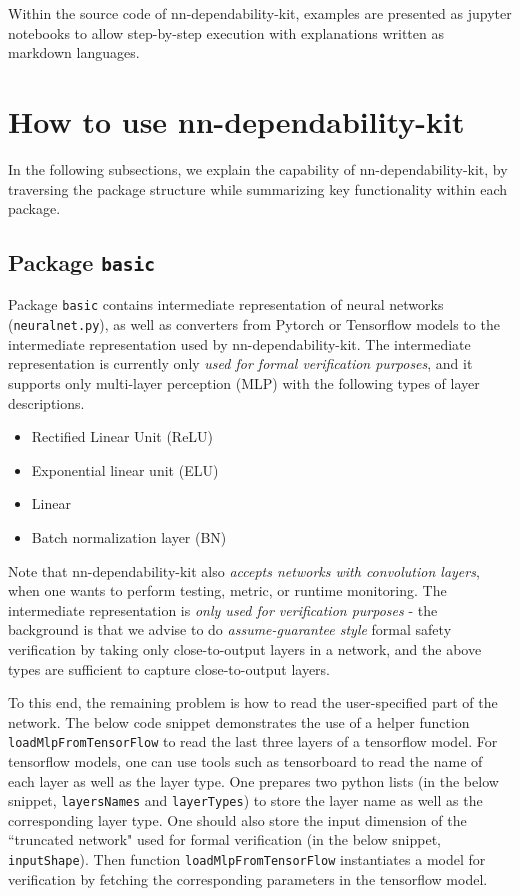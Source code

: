 \documentclass{article}
\begin{document}
Within the source code of \textsf{nn-dependability-kit}, examples are presented as jupyter notebooks to allow step-by-step execution with explanations written as markdown languages.  

\section{How to use \textsf{nn-dependability-kit}}

In the following subsections, we explain the capability of \textsf{nn-dependability-kit}, by traversing the package structure while summarizing key functionality within each package. 

\subsection{Package \texttt{basic}} 

Package \texttt{basic} contains intermediate representation of neural networks (\texttt{neuralnet.py}), as well as converters from Pytorch or Tensorflow models to the intermediate representation used by \textsf{nn-dependability-kit}. The intermediate representation is currently only \emph{used for formal verification purposes}, and it supports only multi-layer perception (MLP) with the following types of layer descriptions. 

\begin{itemize}
    \item Rectified Linear Unit (ReLU)
    \item Exponential linear unit (ELU)
    \item Linear 
    \item Batch normalization layer (BN)
\end{itemize}

Note that \textsf{nn-dependability-kit} also \emph{accepts networks with convolution layers}, when one wants to perform testing, metric, or runtime monitoring. The intermediate representation is \emph{only used for verification purposes} - the background is that we advise to do \emph{assume-guarantee style} formal safety verification by taking only close-to-output layers in a network, and the above types are sufficient to capture close-to-output layers.

To this end, the remaining problem is how to read the user-specified part of the network. The below code snippet demonstrates the use of a helper function \texttt{loadMlpFromTensorFlow} to read the last three layers of a tensorflow model. For tensorflow models, one can use tools such as tensorboard to read the name of each layer as well as the layer type. One prepares two python lists (in the below snippet, \texttt{layersNames} and \texttt{layerTypes}) to store the layer name as well as the corresponding layer type. One should also store the input dimension of the ``truncated network" used for formal verification (in the below snippet, \texttt{inputShape}). Then function \texttt{loadMlpFromTensorFlow} instantiates a model for verification by fetching the corresponding parameters in the tensorflow model. 
\end{document}
